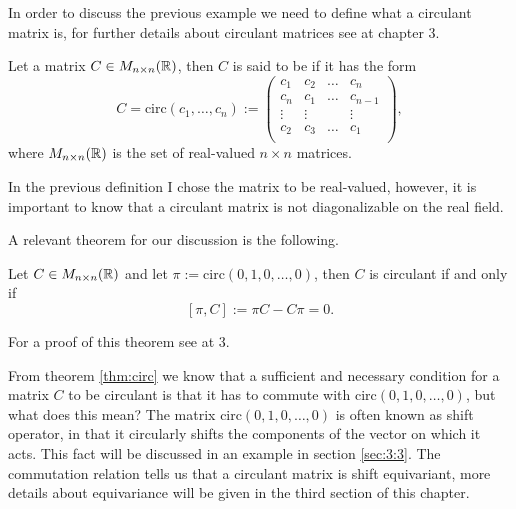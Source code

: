 \documentclass[../3.tex]{subfiles}
\begin{document}
    {\color{blue}
    In order to discuss the previous example we need to define what a circulant matrix is, for further details about circulant matrices see \cite{circulant} at chapter 3.
    
    \begin{defn}
        Let a matrix $C \in M_{n \times n}(\mathbb{R})$, then $C$ is said to be  if it has the form 
        \[ C = \text{circ}(c_1, \dots, c_n) := 
        \begin{pmatrix}
            c_1 & c_2 & \dots & c_n \\
            c_n & c_1 & \dots & c_{n-1}\\
            \vdots & \vdots &  & \vdots \\
            c_2 & c_3 & \dots & c_1 \\
        \end{pmatrix}, \] 
        where $M_{n \times n}(\mathbb{R})$ is the set of real-valued $n \times n$ matrices.
    \end{defn}

    \begin{rem}
        In the previous definition I chose the matrix to be real-valued, however, it is important to know that a circulant matrix is not
        diagonalizable on the real field.
    \end{rem}

    A relevant theorem for our discussion is the following.

    \begin{thm}
        Let $C \in M_{n \times n}(\mathbb{R})$ and let $\pi := \text{circ}(0,1,0,\dots,0)$, then $C$ is circulant if and only if
        \[ [\pi, C] := \pi C - C \pi = 0 . \]
        \label{thm:circ}
    \end{thm}
    
    For a proof of this theorem see \cite{circulant} at 3.

    From theorem \ref{thm:circ} we know that a sufficient and necessary condition for a matrix $C$ to be circulant is that it has to commute
    with $\text{circ}(0,1,0,\dots,0)$, but what does this mean?
    The matrix $\text{circ}(0,1,0,\dots,0)$ is often known as shift operator, in that it circularly shifts the components of the vector on which it acts.
    This fact will be discussed in an example in section \ref{sec:3:3}.
    The commutation relation tells us that a circulant matrix is shift equivariant, more details about equivariance will be given in the third section
    of this chapter.}
\end{document}

